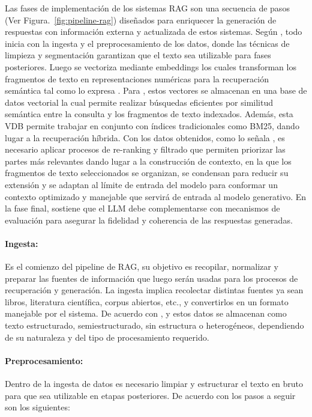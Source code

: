 Las fases de implementación de los sistemas RAG son una secuencia de pasos (Ver Figura.~\ref{fig:pipeline-rag}) diseñados para enriquecer la generación de respuestas con
información externa y actualizada de estos sistemas. 
Según \textcite{tabassum2020}, todo inicia con la ingesta y el preprocesamiento de los datos, donde las técnicas de limpieza y segmentación garantizan 
que el texto sea utilizable para fases posteriores. Luego se vectoriza mediante embeddings los cuales transforman los fragmentos de texto
en representaciones numéricas para la recuperación semántica tal como lo expresa \textcite{minaee2021}. Para \textcite{hu2024ragrau}, estos vectores se almacenan en una base de datos vectorial 
la cual permite realizar búsquedas eficientes por similitud semántica entre la consulta y los fragmentos de texto indexados.
Además, esta VDB permite trabajar en conjunto con índices tradicionales como BM25, dando lugar a la recuperación híbrida.
Con los datos obtenidos, como lo señala \textcite{sarthi2024raptor}, 
es necesario aplicar procesos de re-ranking y filtrado que permiten priorizar las partes más relevantes dando lugar a la construcción de contexto, en la que los fragmentos de texto seleccionados 
se organizan, se condensan para reducir su extensión y se adaptan al límite de entrada del modelo para conformar un contexto optimizado y manejable que servirá de entrada
al modelo generativo. En la fase final, \textcite{knollmeyer2024benchmarking} sostiene que el LLM debe complementarse con mecanismos de evaluación para asegurar la 
fidelidad y coherencia de las respuestas generadas.

\paragraph{Ingesta:} Es el comienzo del pipeline de RAG, su objetivo es recopilar, normalizar y preparar las fuentes de información
que luego serán usadas para los procesos de recuperación y generación. La ingesta implica recolectar distintas fuentes ya sean libros, literatura científica, corpus abiertos, etc., y convertirlos en un formato manejable por el 
sistema. De acuerdo con \textcite{gao2023rag}, \textcite{ibrihich2022review} y \textcite{jing2024vecdb} estos datos se almacenan como texto estructurado, semiestructurado, sin estructura o heterogéneos, dependiendo de su naturaleza y del tipo de procesamiento requerido.

\paragraph{Preprocesamiento:} Dentro de la ingesta de datos es necesario limpiar y estructurar el texto en bruto para que sea utilizable en etapas posteriores. De acuerdo con \textcite{tabassum2020} los pasos a seguir son los siguientes:

